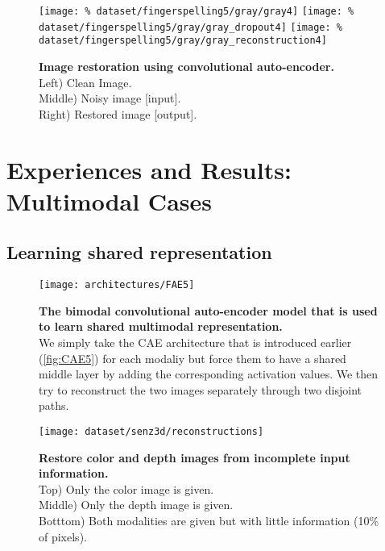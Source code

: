 \begin{figure}[H]
  \centering
  \hfill
  \texttt{[image: \%
    dataset/fingerspelling5/gray/gray4]}
  \hfill
  \texttt{[image: \%
    dataset/fingerspelling5/gray/gray\_dropout4]}
  \hfill
  \texttt{[image: \%
    dataset/fingerspelling5/gray/gray\_reconstruction4]}
  \caption{%
    \textbf{Image restoration using convolutional auto-encoder.}\\[0.1em]
      Left) Clean Image.\\[0.1em]
      Middle) Noisy image [input].\\[0.1em]
      Right) Restored image [output].}
  \label{fig:image_restoration}
\end{figure}

\section{Experiences and Results: Multimodal Cases}

\subsection{Learning shared representation}

\begin{figure}[H]
  \centering
  \texttt{[image: architectures/FAE5]}\\[-2.5em]
  \caption{%
    \textbf{The bimodal convolutional auto-encoder model that is
      used to learn shared multimodal representation.}\\[0.1em]
    We simply take the CAE architecture that is introduced earlier
      (\autoref{fig:CAE5}) for each modaliy but force them to have a
      shared middle layer by adding the corresponding activation values.
      We then try to reconstruct the two images separately through
      two disjoint paths.}
  \label{fig:FAE5}
\end{figure}

\begin{figure}[H]
  \centering
  \texttt{[image: dataset/senz3d/reconstructions]}\\[-1em]
  \caption{%
    \textbf{Restore color and depth images from incomplete input
      information.}\\[0.1em]
    Top) Only the color image is given.\\[0.1em]
    Middle) Only the depth image is given.\\[0.1em]
    Botttom) Both modalities are given but with little information
      (10\% of pixels).}
  \label{fig:color_depth_restoration}
\end{figure}

